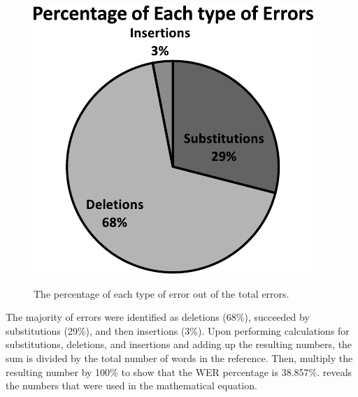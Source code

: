 \documentclass[english]{textolivre}
\begin{document}
\begin{figure}[htbp]
\centering
\begin{minipage}{.45\textwidth}
\includegraphics[width=\textwidth]{Figure4.pdf}
\caption{The percentage of each type of error out of the total errors.}
\label{fig:fig4}
\end{minipage}
\end{figure}

The majority of errors were identified as deletions (68\%), succeeded by
substitutions (29\%), and then insertions (3\%). Upon performing
calculations for substitutions, deletions, and insertions and adding up
the resulting numbers, the sum is divided by the total number of words
in the reference. Then, multiply the resulting number by 100\% to show
that the WER percentage is 38.857\%.  reveals the numbers that
were used in the mathematical equation.
\end{document}
